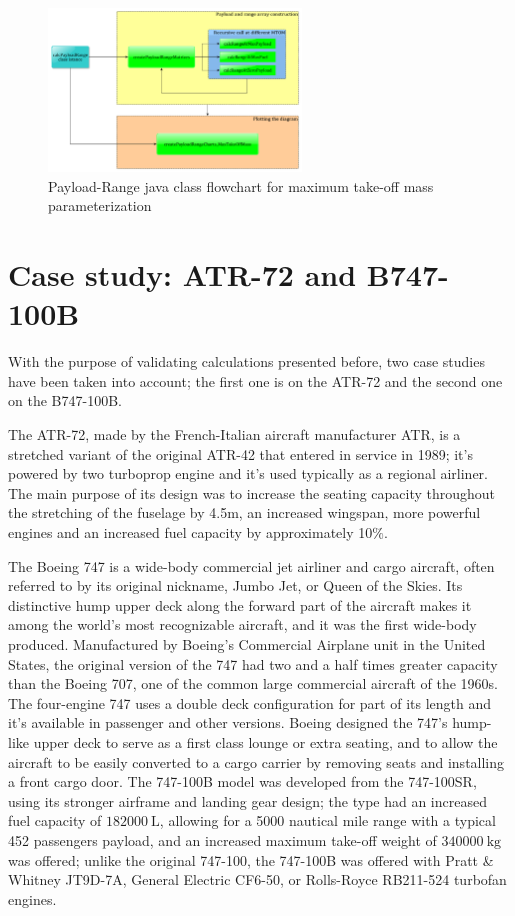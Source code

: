 \documentclass[a4paper,12pt,oneside]{book}
\begin{document}
\bigskip
\begin{figure}[!hb]
\centering
\includegraphics[keepaspectratio, width=0.6\textwidth]{PayloadRange_MTOM_Flowchart}
\caption{Payload-Range java class flowchart for maximum take-off mass parameterization}
\label{fig:Figure4}
\end{figure}

\section{Case study: ATR-72 and B747-100B}
With the purpose of validating calculations presented before, two case studies have been taken into account; the first one is on the ATR-72 and the second one on the B747-100B.

\bigskip
The ATR-72, made by the French-Italian aircraft manufacturer ATR, is a stretched variant of the original ATR-42 that entered in service in 1989; it’s powered by two turboprop engine and it’s used typically as a regional airliner. The main purpose of its design was to increase the seating capacity throughout the stretching of the fuselage by 4.5m, an increased wingspan, more powerful engines and an increased fuel capacity by approximately 10$\%$.

\bigskip
The Boeing 747 is a wide-body commercial jet airliner and cargo aircraft, often referred to by its original nickname, Jumbo Jet, or Queen of the Skies. Its distinctive hump upper deck along the forward part of the aircraft makes it among the world's most recognizable aircraft, and it was the first wide-body produced. Manufactured by Boeing's Commercial Airplane unit in the United States, the original version of the 747 had two and a half times greater capacity than the Boeing 707, one of the common large commercial aircraft of the 1960s. The four-engine 747 uses a double deck configuration for part of its length and it’s available in passenger and other versions. Boeing designed the 747's hump-like upper deck to serve as a first class lounge or extra seating, and to allow the aircraft to be easily converted to a cargo carrier by removing seats and installing a front cargo door. The 747-100B model was developed from the 747-100SR, using its stronger airframe and landing gear design; the type had an increased fuel capacity of $\SI{182000}{\liter}$, allowing for a 5000 nautical mile range with a typical 452 passengers payload, and an increased maximum take-off weight of $\SI{340000}{\kilogram}$ was offered; unlike the original 747-100, the 747-100B was offered with Pratt \& Whitney JT9D-7A, General Electric CF6-50, or Rolls-Royce RB211-524 turbofan engines.
\end{document}
